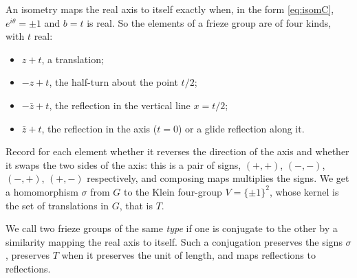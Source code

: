 An isometry maps the real axis to itself exactly when, in the form \eqref{eq:isomC}, $e^{i\theta}=\pm1$ and $b=t$ is real. So the elements
of a frieze group are of four kinds, with $t$ real:
\begin{itemize}
\item $z+t$, a translation;
\item $-z+t$, the half-turn about the point $t/2$;
\item $-\bar z+t$, the reflection in the vertical line $x=t/2$;
\item $\bar z+t$, the reflection in the axis ($t=0$) or a glide reflection along it.
\end{itemize}
Record for each element whether it reverses the direction of the axis and whether it swaps the two sides of the axis: this is a pair of
signs, $(+,+)$, $(-,-)$, $(-,+)$, $(+,-)$ respectively, and composing maps multiplies the signs. We get a homomorphism $\sigma$ from $G$ to the
Klein four-group $V=\{\pm1\}^2$, whose kernel is the set of translations in $G$, that is $T$.

We call two frieze groups of the same \emph{type} if one is conjugate to the other by a similarity mapping the real axis to itself. Such a
conjugation preserves the signs $\sigma$, preserves $T$ when it preserves the unit of length, and maps reflections to reflections.


